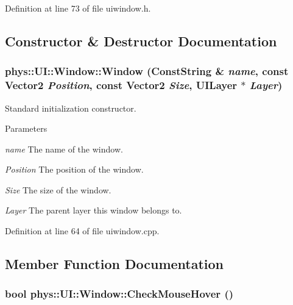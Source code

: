 Definition at line 73 of file uiwindow.h.



\subsection{Constructor \& Destructor Documentation}
\hypertarget{classphys_1_1UI_1_1Window_aefaaf53a19b0b298e0a5c96d505d7355}{
\subsubsection[{Window}]{\setlength{\rightskip}{0pt plus 5cm}phys::UI::Window::Window ({\bf ConstString} \& {\em name}, \/  const {\bf Vector2} {\em Position}, \/  const {\bf Vector2} {\em Size}, \/  {\bf UILayer} $\ast$ {\em Layer})}}
\label{d4/d86/classphys_1_1UI_1_1Window_aefaaf53a19b0b298e0a5c96d505d7355}


Standard initialization constructor. 


\begin{DoxyParams}{Parameters}
\item[{\em name}]The name of the window. \item[{\em Position}]The position of the window. \item[{\em Size}]The size of the window. \item[{\em Layer}]The parent layer this window belongs to. \end{DoxyParams}


Definition at line 64 of file uiwindow.cpp.



\subsection{Member Function Documentation}
\hypertarget{classphys_1_1UI_1_1Window_a771bc9e43c0492ab179d8126c30665cf}{
\subsubsection[{CheckMouseHover}]{\setlength{\rightskip}{0pt plus 5cm}bool phys::UI::Window::CheckMouseHover ()}}
\label{d4/d86/classphys_1_1UI_1_1Window_a771bc9e43c0492ab179d8126c30665cf}


